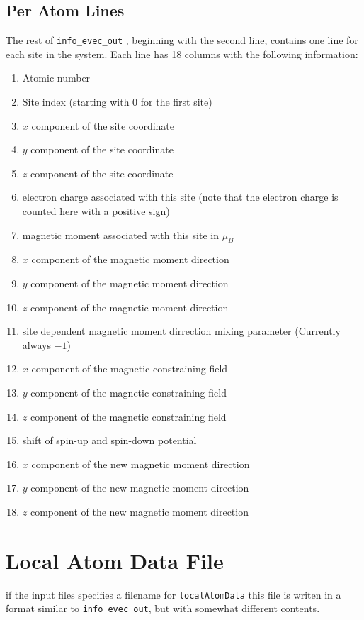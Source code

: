 \subsection{Per Atom Lines}
The rest of \texttt{info\_evec\_out} , beginning with the second line, contains one line for each site in the system.
Each line has 18 columns with the following information:
\begin{enumerate}
\item Atomic number
\item Site index (starting with 0 for the first site)
\item $x$ component of the site coordinate
\item $y$ component of the site coordinate
\item $z$ component of the site coordinate
\item electron charge associated with this site (note that the electron charge is counted here with a positive sign)
\item magnetic moment associated with this site in $\mu_B$
\item $x$ component of the magnetic moment direction
\item $y$ component of the magnetic moment direction
\item $z$ component of the magnetic moment direction
\item site dependent magnetic moment dirrection mixing parameter (Currently always $-1$)
\item $x$ component of the magnetic constraining field
\item $y$ component of the magnetic constraining field
\item $z$ component of the magnetic constraining field
\item shift of spin-up and spin-down potential
\item $x$ component of the new magnetic moment direction
\item $y$ component of the new magnetic moment direction
\item $z$ component of the new magnetic moment direction 
\end{enumerate}

\section{Local Atom Data File}
if the input files specifies a filename for \texttt{localAtomData} this file is writen in a format similar to \texttt{info\_evec\_out}, but with somewhat different contents.
